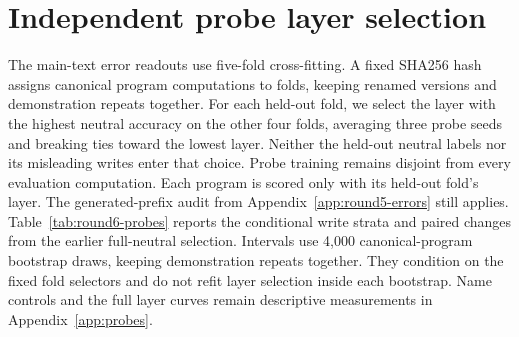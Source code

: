 \newsavebox{\roundsixbox}
\section{Independent probe layer selection}
\label{app:round6-probes}
The main-text error readouts use five-fold cross-fitting. A fixed SHA256 hash assigns canonical program computations to folds, keeping renamed versions and demonstration repeats together. For each held-out fold, we select the layer with the highest neutral accuracy on the other four folds, averaging three probe seeds and breaking ties toward the lowest layer. Neither the held-out neutral labels nor its misleading writes enter that choice. Probe training remains disjoint from every evaluation computation.
Each program is scored only with its held-out fold's layer. The generated-prefix audit from Appendix~\ref{app:round5-errors} still applies. Table~\ref{tab:round6-probes} reports the conditional write strata and paired changes from the earlier full-neutral selection. Intervals use 4,000 canonical-program bootstrap draws, keeping demonstration repeats together. They condition on the fixed fold selectors and do not refit layer selection inside each bootstrap. Name controls and the full layer curves remain descriptive measurements in Appendix~\ref{app:probes}.
\begin{table}[t]
\centering\small
{}
\ifdim\wd\roundsixbox>\textwidth\resizebox{\textwidth}{!}{\usebox{\roundsixbox}}\else\usebox{\roundsixbox}\fi
\caption{True-digit readouts with independent layer selection. Changes compare the same observed writes with the earlier full-neutral layer choice. A dash denotes an empty stratum. These readouts establish decodability, not causal use.}
\label{tab:round6-probes}
\end{table}
